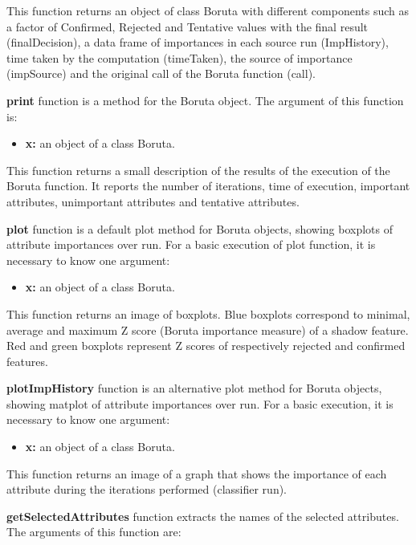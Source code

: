 This function returns an object of class Boruta with different components such as a factor of Confirmed, Rejected and Tentative values with the final result (finalDecision), a data frame of importances in each source run (ImpHistory), time taken by the computation (timeTaken), the source of importance (impSource) and the original call of the Boruta function (call).

\textbf{print} function is a method for the Boruta object. The argument of this function is:

\begin{itemize}
    \item \textbf{x:} an object of a class Boruta.
\end{itemize}

This function returns a small description of the results of the execution of the Boruta function. It reports the number of iterations, time of execution, important attributes, unimportant attributes and tentative attributes.

\textbf{plot} function is a default plot method for Boruta objects, showing boxplots of attribute importances over run. For a basic execution of plot function, it is necessary to know one argument:

\begin{itemize}
    \item \textbf{x:} an object of a class Boruta.
\end{itemize}

This function returns an image of boxplots. Blue boxplots correspond to minimal, average
and maximum Z score (Boruta importance measure) of a shadow feature. Red and green boxplots represent Z scores of respectively rejected and confirmed features.

\textbf{plotImpHistory} function is an alternative plot method for Boruta objects, showing matplot of attribute importances over run. For a basic execution, it is necessary to know one argument:

\begin{itemize}
    \item \textbf{x:} an object of a class Boruta.
\end{itemize}

This function returns an image of a graph that shows the importance of each attribute during the iterations performed (classifier run).

\textbf{getSelectedAttributes} function extracts the names of the selected attributes. The arguments of this function are:

